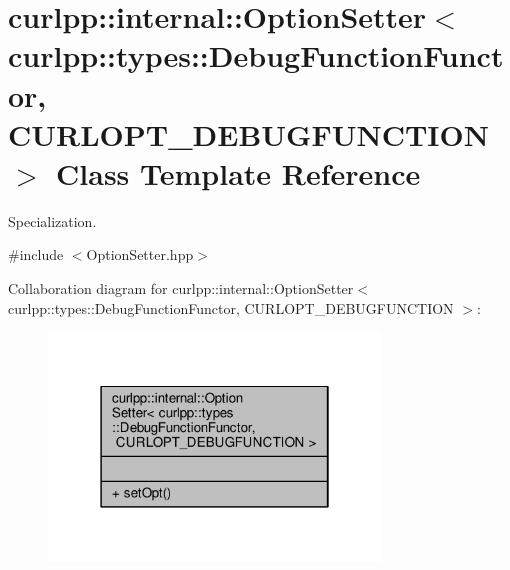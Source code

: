 \hypertarget{classcurlpp_1_1internal_1_1OptionSetter_3_01curlpp_1_1types_1_1DebugFunctionFunctor_00_01CURLOPT__DEBUGFUNCTION_01_4}{\section{curlpp\-:\-:internal\-:\-:Option\-Setter$<$ curlpp\-:\-:types\-:\-:Debug\-Function\-Functor, C\-U\-R\-L\-O\-P\-T\-\_\-\-D\-E\-B\-U\-G\-F\-U\-N\-C\-T\-I\-O\-N $>$ Class Template Reference}
\label{classcurlpp_1_1internal_1_1OptionSetter_3_01curlpp_1_1types_1_1DebugFunctionFunctor_00_01CURLOPT__DEBUGFUNCTION_01_4}
}


Specialization.  




{\ttfamily \#include $<$Option\-Setter.\-hpp$>$}



Collaboration diagram for curlpp\-:\-:internal\-:\-:Option\-Setter$<$ curlpp\-:\-:types\-:\-:Debug\-Function\-Functor, C\-U\-R\-L\-O\-P\-T\-\_\-\-D\-E\-B\-U\-G\-F\-U\-N\-C\-T\-I\-O\-N $>$\-:\nopagebreak
\begin{figure}[H]
\begin{center}
\leavevmode
\includegraphics[width=250pt]{classcurlpp_1_1internal_1_1OptionSetter_3_01curlpp_1_1types_1_1DebugFunctionFunctor_00_01CURLOPT0cdc21ce315c04a5e720ab64149a961f}
\end{center}
\end{figure}

